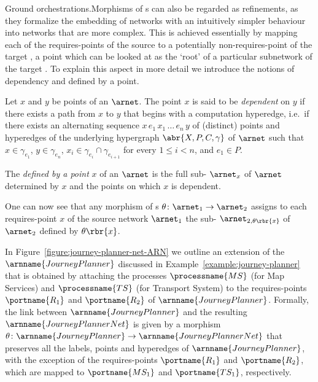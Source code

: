 \documentclass{LMCS}
\begin{document}
  \begin{minisection}{Ground orchestrations.}Morphisms of s can also be regarded as refinements, as they formalize the embedding of networks with an intuitively simpler behaviour into networks that are more complex.  This is achieved essentially by mapping each of the requires-points of the source  to a potentially non-requires-point of the target , a point which can be looked at as the `root' of a particular subnetwork of the target .
    To explain this aspect in more detail we introduce the notions of dependency and  defined by a point.

    \begin{defi}[Dependency]
      Let \(x\) and \(y\) be points of an  \(\arnet\).
      The point \(x\) is said to be \emph{dependent} on \(y\) if there exists a path from \(x\) to \(y\) that begins with a computation hyperedge, i.e.\ if there exists an alternating sequence \(x\, e_{1}\, x_{1}\, \dotso\, e_{n}\, y\) of (distinct) points and hyperedges of the underlying hypergraph \(\abr{X, P, C, \gamma}\) of \(\arnet\) such that \(x \in \gamma_{e_{1}}\), \(y \in \gamma_{e_{n}}\), \(x_{i} \in \gamma_{e_{i}} \cap \gamma_{e_{i+1}}\) for every \(1 \leq i < n\), and \(e_{1} \in P\).
    \end{defi}

    \begin{defi}
      The \emph{ defined by a point} \(x\) of an  \(\arnet\) is the full sub- \(\arnet_{x}\) of \(\arnet\) determined by \(x\) and the points on which \(x\) is dependent.
    \end{defi}

    One can now see that any morphism of s \(\theta \colon \arnet_{1} \to \arnet_{2}\) assigns to each requires-point \(x\) of the source network \(\arnet_{1}\) the sub- \(\arnet_{2, \theta\rbr{x}}\) of \(\arnet_{2}\) defined by \(\theta\rbr{x}\).

    \begin{exa}
      \label{example:journey-planner-net}
      In Figure~\ref{figure:journey-planner-net-ARN} we outline an extension of the  \(\arnname{JourneyPlanner}\) discussed in Example~\ref{example:journey-planner} that is obtained by attaching the processes \(\processname{MS}\) (for Map Services) and \(\processname{TS}\) (for Transport System) to the requires-points \(\portname{R_{1}}\) and \(\portname{R_{2}}\) of \(\arnname{JourneyPlanner}\).
      Formally, the link between \(\arnname{JourneyPlanner}\) and the resulting  \(\arnname{JourneyPlannerNet}\) is given by a morphism \(\theta \colon \arnname{JourneyPlanner} \to \arnname{JourneyPlannerNet}\) that preserves all the labels, points and hyperedges of \(\arnname{JourneyPlanner}\), with the exception of the requires-points \(\portname{R_{1}}\) and \(\portname{R_{2}}\), which are mapped to \(\portname{MS_{1}}\) and \(\portname{TS_{1}}\), respectively.


\end{exa}
\end{minisection}
\end{document}
